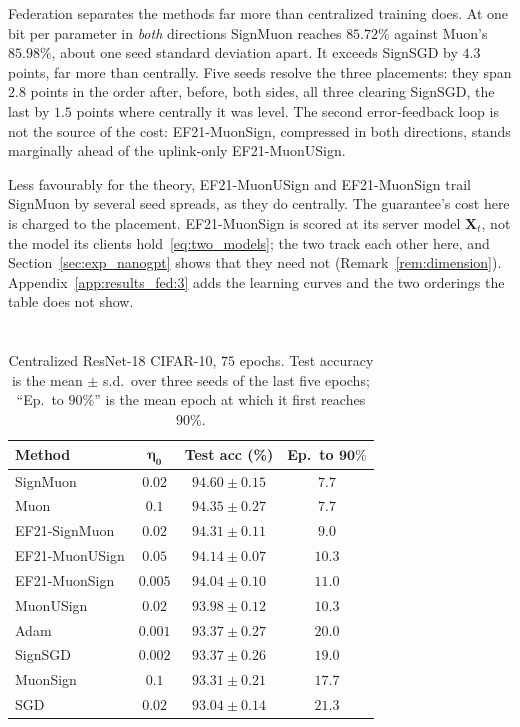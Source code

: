 Federation separates the methods far more than centralized training does. At one bit per parameter in \emph{both} directions SignMuon reaches $85.72\%$ against Muon's $85.98\%$, about one seed standard deviation apart. It exceeds SignSGD by $4.3$ points, far more than centrally. Five seeds resolve the three placements: they span $2.8$ points in the order after, before, both sides, all three clearing SignSGD, the last by $1.5$ points where centrally it was level. The second error-feedback loop is not the source of the cost: EF21-MuonSign, compressed in both directions, stands marginally ahead of the uplink-only EF21-MuonUSign.

Less favourably for the theory, EF21-MuonUSign and EF21-MuonSign trail SignMuon by several seed spreads, as they do centrally. The guarantee's cost here is charged to the placement. EF21-MuonSign is scored at its server model $\mathbf{X}_t$, not the model its clients hold~\eqref{eq:two_models}; the two track each other here, and Section~\ref{sec:exp_nanogpt} shows that they need not (Remark~\ref{rem:dimension}). Appendix~\ref{app:results_fed:3} adds the learning curves and the two orderings the table does not show.

\section{}\label{app:opt:cen}

\begin{table}[!ht]
\centering
\footnotesize
\renewcommand{\arraystretch}{1.05}
\begin{tabular}{@{}lccc@{}}
\toprule
\textbf{Method} & $\boldsymbol{\eta_0}$ & \textbf{Test acc (\%)} & \textbf{Ep.\ to $\mathbf{90\%}$} \\
\midrule
SignMuon & $0.02$ & $94.60 \pm 0.15$ & $7.7$ \\
Muon & $0.1$ & $94.35 \pm 0.27$ & $7.7$ \\
EF21-SignMuon & $0.02$ & $94.31 \pm 0.11$ & $9.0$ \\
EF21-MuonUSign & $0.05$ & $94.14 \pm 0.07$ & $10.3$ \\
EF21-MuonSign & $0.005$ & $94.04 \pm 0.10$ & $11.0$ \\
MuonUSign & $0.02$ & $93.98 \pm 0.12$ & $10.3$ \\
Adam & $0.001$ & $93.37 \pm 0.27$ & $20.0$ \\
SignSGD & $0.002$ & $93.37 \pm 0.26$ & $19.0$ \\
MuonSign & $0.1$ & $93.31 \pm 0.21$ & $17.7$ \\
SGD & $0.02$ & $93.04 \pm 0.14$ & $21.3$ \\
\bottomrule
\end{tabular}
\caption{Centralized  ResNet-18  CIFAR-10, $75$ epochs. Test accuracy is the mean $\pm$ s.d.\ over three seeds of the last five epochs; ``Ep.\ to $90\%$'' is the mean epoch at which it first reaches $90\%$.}
\label{tab:cifar_main}
\end{table}


